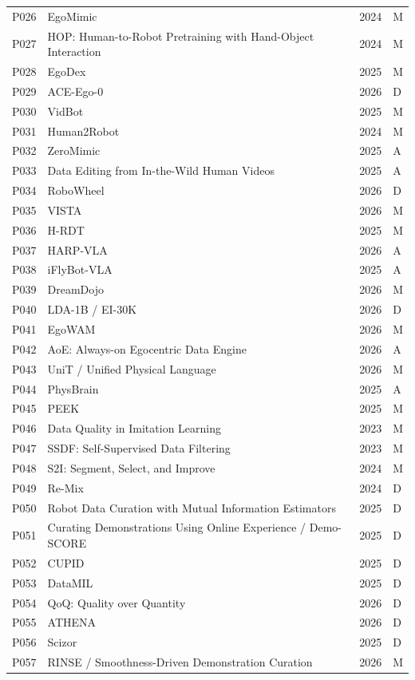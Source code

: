 \begin{longtable}{@{}p{1.3cm}p{11.8cm}p{2.2cm}p{1.2cm}@{}}
P026 & EgoMimic & 2024 & M \\
P027 & HOP: Human-to-Robot Pretraining with Hand-Object Interaction & 2024 & M \\
P028 & EgoDex & 2025 & M \\
P029 & ACE-Ego-0 & 2026 & D \\
P030 & VidBot & 2025 & M \\
P031 & Human2Robot & 2024 & M \\
P032 & ZeroMimic & 2025 & A \\
P033 & Data Editing from In-the-Wild Human Videos & 2025 & A \\
P034 & RoboWheel & 2026 & D \\
P035 & VISTA & 2026 & M \\
P036 & H-RDT & 2025 & M \\
P037 & HARP-VLA & 2026 & A \\
P038 & iFlyBot-VLA & 2025 & A \\
P039 & DreamDojo & 2026 & M \\
P040 & LDA-1B / EI-30K & 2026 & D \\
P041 & EgoWAM & 2026 & M \\
P042 & AoE: Always-on Egocentric Data Engine & 2026 & A \\
P043 & UniT / Unified Physical Language & 2026 & M \\
P044 & PhysBrain & 2025 & A \\
P045 & PEEK & 2025 & M \\
P046 & Data Quality in Imitation Learning & 2023 & M \\
P047 & SSDF: Self-Supervised Data Filtering & 2023 & M \\
P048 & S2I: Segment, Select, and Improve & 2024 & M \\
P049 & Re-Mix & 2024 & D \\
P050 & Robot Data Curation with Mutual Information Estimators & 2025 & D \\
P051 & Curating Demonstrations Using Online Experience / Demo-SCORE & 2025 & D \\
P052 & CUPID & 2025 & D \\
P053 & DataMIL & 2025 & D \\
P054 & QoQ: Quality over Quantity & 2026 & D \\
P055 & ATHENA & 2026 & D \\
P056 & Scizor & 2025 & D \\
P057 & RINSE / Smoothness-Driven Demonstration Curation & 2026 & M \\

\end{longtable}
